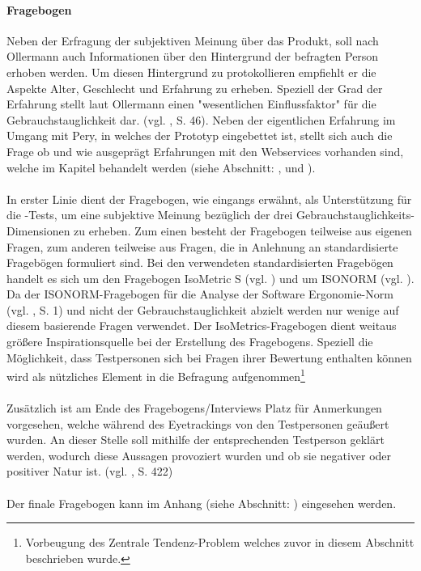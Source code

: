 \documentclass[Bachelorarbeit.tex]{subfiles}
\begin{document}
\paragraph{Fragebogen}
Neben der Erfragung der subjektiven Meinung über das Produkt, soll nach Ollermann auch Informationen über den Hintergrund der befragten Person erhoben werden.
Um diesen Hintergrund zu protokollieren empfiehlt er die Aspekte Alter, Geschlecht und Erfahrung zu erheben.
Speziell der Grad der Erfahrung stellt laut Ollermann einen "wesentlichen Einflussfaktor" für die Gebrauchstauglichkeit dar. (vgl. \cite{Ollermann2007}, S. 46). 
Neben der eigentlichen Erfahrung im Umgang mit Pery, in welches der Prototyp eingebettet ist, stellt sich auch die Frage ob und wie ausgeprägt Erfahrungen mit den Webservices vorhanden sind, welche im Kapitel  behandelt werden (siehe Abschnitt: ,  und ).\\
\\
In erster Linie dient der Fragebogen, wie eingangs erwähnt, als Unterstützung für die -Tests, um eine subjektive Meinung bezüglich der drei Gebrauchstauglichkeits-Dimensionen zu erheben. 
Zum einen besteht der Fragebogen teilweise aus eigenen Fragen, zum anderen teilweise aus Fragen, die in Anlehnung an standardisierte Fragebögen formuliert sind.
Bei den verwendeten standardisierten Fragebögen handelt es sich um den Fragebogen IsoMetric S (vgl. \cite{IsoMetricS}) und um ISONORM (vgl. \cite{IsonormL}).
Da der ISONORM-Fragebogen für die Analyse der Software Ergonomie-Norm (vgl. \cite{IsonormL}, S. 1) und nicht der Gebrauchstauglichkeit abzielt werden nur wenige auf diesem basierende Fragen verwendet.
Der IsoMetrics-Fragebogen dient weitaus größere Inspirationsquelle bei der Erstellung des Fragebogens.
Speziell die Möglichkeit, dass Testpersonen sich bei Fragen ihrer Bewertung enthalten können wird als nützliches Element in die Befragung aufgenommen\footnote{Vorbeugung des Zentrale Tendenz-Problem welches zuvor in diesem Abschnitt beschrieben wurde.}\\
\\
Zusätzlich ist am Ende des Fragebogens/Interviews Platz für Anmerkungen vorgesehen, welche während des Eyetrackings von den Testpersonen geäußert wurden.
An dieser Stelle soll mithilfe der entsprechenden Testperson geklärt werden, wodurch diese Aussagen provoziert wurden und ob sie negativer oder positiver Natur ist. (vgl. \cite{Niegemann2008}, S. 422)\\
\\
Der finale Fragebogen kann im Anhang (siehe Abschnitt: ) eingesehen werden.
\end{document}
